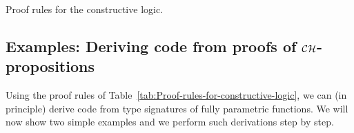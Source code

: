 \begin{table}
\begin{centering}
{\small{}}%
\par\end{centering}
\caption{Proof rules for the constructive logic.\label{tab:Proof-rules-for-constructive-logic}}
\end{table}


\subsection{Examples: Deriving code from proofs of ${\cal CH}$-propositions\label{subsec:Example:-Proving-a-ch-proposition}}

Using the proof rules of Table~\ref{tab:Proof-rules-for-constructive-logic},
we can (in principle) derive code from type signatures of fully parametric
functions. We will now show two simple examples and we perform such
derivations step by step.

